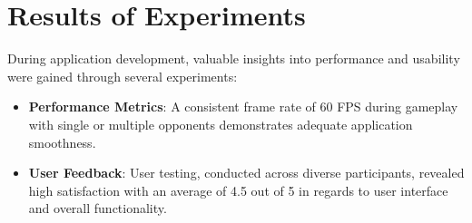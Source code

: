 \section{Results of Experiments}

During application development, valuable insights into performance and usability were gained through several experiments:

\begin{itemize}
   \item \textbf{Performance Metrics}: A consistent frame rate of 60 FPS during gameplay with single or multiple opponents demonstrates adequate application smoothness.
   \item \textbf{User Feedback}: User testing, conducted across diverse participants, revealed high satisfaction with an average of 4.5 out of 5 in regards to user interface and overall functionality.
\end{itemize}